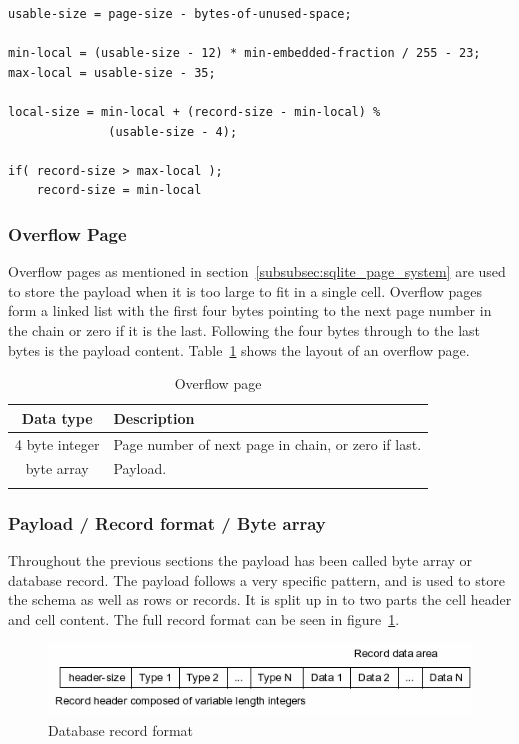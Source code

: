 \begin{lstlisting}	
usable-size = page-size - bytes-of-unused-space;

min-local = (usable-size - 12) * min-embedded-fraction / 255 - 23;
max-local = usable-size - 35;

local-size = min-local + (record-size - min-local) %
			  (usable-size - 4);

if( record-size > max-local );
	record-size = min-local
\end{lstlisting}


\subsubsection{Overflow Page}
\label{subsubsec:overflow_page}

Overflow pages as mentioned in section~\ref{subsubsec:sqlite_page_system} are used to store the payload when it is too large to fit in a single cell. Overflow pages form a linked list with the first four bytes pointing to the next page number in the chain or zero if it is the last. Following the four bytes through to the last bytes is the payload content. Table~\ref{tbl:overflow_page} shows the layout of an overflow page.

\begin{longtable}[h]{| c | p{5cm} |}
		\hline
			\textbf{Data type} & \textbf{Description} \\ 
		\hline
		\endhead
			4 byte integer & Page number of next page in chain, or zero if last. \\
		\hline
			byte array & Payload. \\
		\hline
	\caption{Overflow page}
	\label{tbl:overflow_page}
\end{longtable}

\subsubsection{Payload / Record format / Byte array}
\label{subsubsec:record_format}

Throughout the previous sections the payload has been called byte array or database record. The payload follows a very specific pattern, and is used to store the schema as well as rows or records. It is split up in to two parts the cell header and cell content. The full record format can be seen in figure~\ref{fig:sqlite_record_format}.

\begin{figure}[H]
	\centering
	\includegraphics[scale=0.7]{images/recordformat.png}
	\caption{Database record format \citep{sqliteray}}
	\label{fig:sqlite_record_format}
\end{figure}

